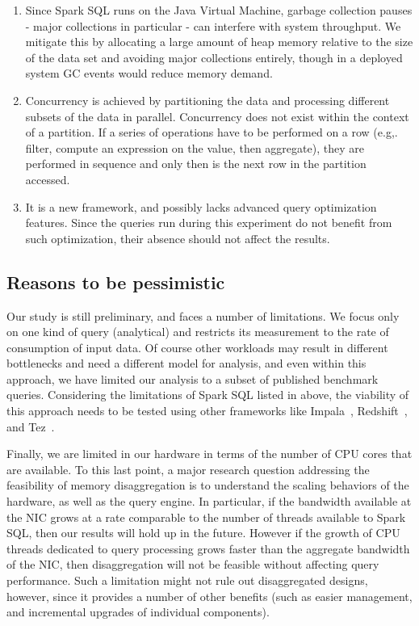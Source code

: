 \documentclass[9pt]{sig-alternate-05-2015}
\begin{document}
\begin{enumerate}
\item Since Spark SQL runs on the Java Virtual Machine, garbage collection
pauses - major collections in particular - can interfere with system
throughput. We mitigate this by allocating a large amount of heap memory
relative to the size of the data set and avoiding major collections entirely,
though in a deployed system GC events would reduce memory demand.

\item Concurrency is achieved by partitioning the data and processing different
subsets of the data in parallel. Concurrency does not exist within the context
of a partition. If a series of operations have to be performed on a row (e.g,.
filter, compute an expression on the value, then aggregate), they are performed
in sequence and only then is the next row in the partition accessed.

\item It is a new framework, and possibly lacks advanced query optimization
features. Since the queries run during this experiment do not benefit from such
optimization, their absence should not affect the results.
\end{enumerate}

\subsection{Reasons to be pessimistic}

Our study is still preliminary, and faces a number of limitations.  We focus
only on one kind of query (analytical) and restricts its measurement to the
rate of consumption of input data. Of course other workloads may result in
different bottlenecks and need a different model for analysis, and even within
this approach, we have limited our analysis to a subset of published benchmark
queries.  Considering the limitations of Spark SQL listed in above, the
viability of this approach needs to be tested using other frameworks like
Impala~\cite{impala}, Redshift~\cite{redshift}, and Tez~\cite{tez}.

Finally, we are limited in our hardware in terms of the number of CPU cores
that are available.  To this last point, a major research question addressing
the feasibility of memory disaggregation is to understand the scaling behaviors
of the hardware, as well as the query engine.  In particular, if the bandwidth
available at the NIC grows at a rate comparable to the number of threads
available to Spark SQL, then our results will hold up in the future.  However
if the growth of CPU threads dedicated to query processing grows faster than
the aggregate bandwidth of the NIC, then disaggregation will not be feasible
without affecting query performance.  Such a limitation might not rule out
disaggregated designs, however, since it provides a number of other benefits
(such as easier management, and incremental upgrades of individual components).
\end{document}
